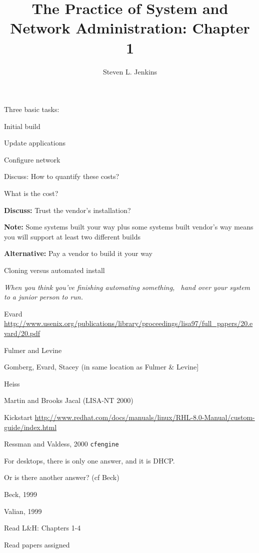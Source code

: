 \documentclass{slides}
\title{The Practice of System and Network Administration: Chapter 1}
\author{Steven L. Jenkins}
\begin{document}
\maketitle


Three basic tasks:

\be
\item Initial build
\item Update applications
\item Configure network
\ee

\bd
\item[Discuss:] How to quantify these costs?
\ed


\bi
\item What is the cost?
\item {\bf Discuss: }Trust the vendor's installation?
\item {\bf Note: } Some systems built your way plus some systems
	built vendor's way means you will support at least two different builds
\item {\bf Alternative: } Pay a vendor to build it your way
\item Cloning versus automated install
\item \emph{When you think you've finishing automating something, \
	hand over your system to a junior person to run.}
\ei


\bd
\item[Evard] \url{http://www.usenix.org/publications/library/proceedings/lisa97/full_papers/20.evard/20.pdf}
\item[Fulmer and Levine]
\item[Gomberg, Evard, Stacey] (in same location as Fulmer \& Levine]
\item[Heiss] 
\item[Martin and Brooks] Jacal (LISA-NT 2000)
\item[Kickstart] \url{http://www.redhat.com/docs/manuals/linux/RHL-8.0-Manual/custom-guide/index.html}
\ed



\bd
\item[Ressman and Valdess, 2000] {\tt cfengine}
\ed


For desktops, there is only one answer, and it is DHCP.

Or is there another answer?  (cf Beck)


\bd
\item[Beck, 1999]
\item[Valian, 1999]
\ed


\bi
\item Read L\&H: Chapters 1-4
\item Read papers assigned
\ei
\end{document}
